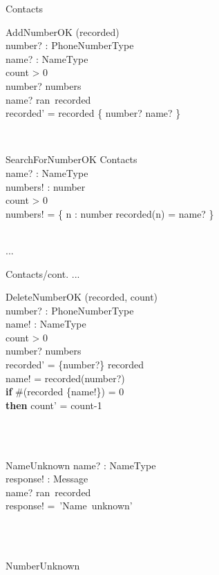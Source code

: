 \documentclass[12pt]{article}
\begin{document}
\begin{spacing}{1.5}
\begin{class}{Contacts}
\begin{op}{AddNumberOK}
\Delta (recorded) \\
number? : PhoneNumberType\\
name? : NameType\\
\ST
count > 0 \\
number? \notin numbers\\
name? \in ran~recorded\\
recorded' = recorded \cup \{ number? \mapsto name? \} \\
\end{op}\\
\begin{op}{SearchForNumberOK}
\Xi Contacts\\
name? : NameType\\
numbers! : \pset number\\
\ST
count > 0 \\
numbers! = \{ n : number \cbar recorded(n) = name? \}
\end{op}\\
...
\end{class}
\newpage
\begin{class}{Contacts/cont.}
...
\also
\begin{op}{DeleteNumberOK}
\Delta (recorded, count) \\
number? : PhoneNumberType\\
name! : NameType\\
\ST
count > 0 \\
number? \in numbers\\
recorded' = \{number?\} \ndres recorded \\
name! = recorded(number?)\\
\textbf{if }\#(recorded \rres \{name!\}) = 0\\
\textbf{then } count' = count-1\\
\end{op}\\
\\
\begin{op}{NameUnknown}
name? : NameType\\
response! : Message\\
\ST
name? \notin ran~recorded\\
response! =~'Name~unknown'
\end{op}\\
\\
\begin{op}{NumberUnknown}

\end{op}
\end{class}
\end{spacing}
\end{document}
